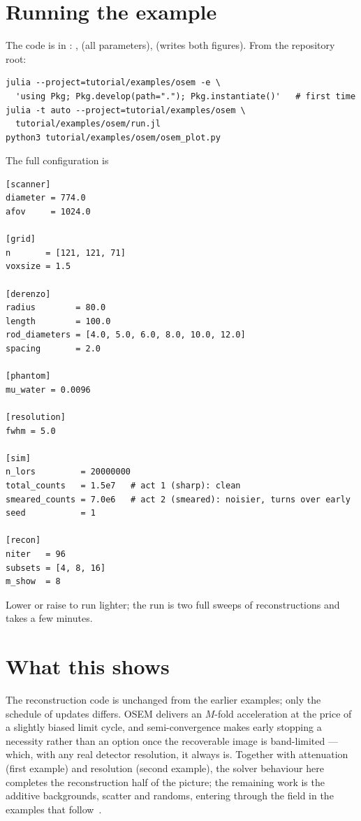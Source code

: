 \documentclass[11pt,a4paper]{article}
\begin{document}
\section{Running the example}
\label{sec:ex-osem:run}

The code is in : , 
(all parameters),  (writes both figures). From the repository
root:
\begin{lstlisting}
julia --project=tutorial/examples/osem -e \
  'using Pkg; Pkg.develop(path="."); Pkg.instantiate()'   # first time
julia -t auto --project=tutorial/examples/osem \
  tutorial/examples/osem/run.jl
python3 tutorial/examples/osem/osem_plot.py
\end{lstlisting}
The full configuration is
\begin{lstlisting}
[scanner]
diameter = 774.0
afov     = 1024.0

[grid]
n       = [121, 121, 71]
voxsize = 1.5

[derenzo]
radius        = 80.0
length        = 100.0
rod_diameters = [4.0, 5.0, 6.0, 8.0, 10.0, 12.0]
spacing       = 2.0

[phantom]
mu_water = 0.0096

[resolution]
fwhm = 5.0

[sim]
n_lors         = 20000000
total_counts   = 1.5e7   # act 1 (sharp): clean
smeared_counts = 7.0e6   # act 2 (smeared): noisier, turns over early
seed           = 1

[recon]
niter   = 96
subsets = [4, 8, 16]
m_show  = 8
\end{lstlisting}
Lower  or raise  to run lighter; the run is two full
sweeps of reconstructions and takes a few minutes.

\section{What this shows}
\label{sec:ex-osem:next}

The reconstruction code is unchanged from the earlier examples; only the schedule
of updates differs. OSEM delivers an $M$-fold acceleration at the price of a
slightly biased limit cycle, and semi-convergence makes early stopping a
necessity rather than an option once the recoverable image is band-limited ---
which, with any real detector resolution, it always is. Together with attenuation
(first example) and resolution (second example), the solver behaviour here
completes the reconstruction half of the picture; the remaining work is the
additive backgrounds, scatter and randoms, entering through the
\code{contamination} field in the examples that follow~\cite{crysp2026}.


\end{document}
